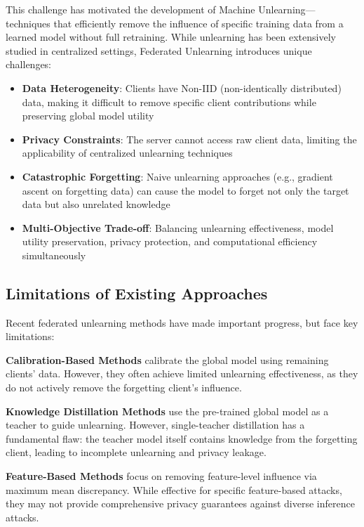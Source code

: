 \documentclass[11pt,a4paper]{article}
\begin{document}
This challenge has motivated the development of Machine Unlearning—techniques that efficiently remove the influence of specific training data from a learned model without full retraining. While unlearning has been extensively studied in centralized settings, Federated Unlearning introduces unique challenges:

\begin{itemize}
\item \textbf{Data Heterogeneity}: Clients have Non-IID (non-identically distributed) data, making it difficult to remove specific client contributions while preserving global model utility
\item \textbf{Privacy Constraints}: The server cannot access raw client data, limiting the applicability of centralized unlearning techniques
\item \textbf{Catastrophic Forgetting}: Naive unlearning approaches (e.g., gradient ascent on forgetting data) can cause the model to forget not only the target data but also unrelated knowledge
\item \textbf{Multi-Objective Trade-off}: Balancing unlearning effectiveness, model utility preservation, privacy protection, and computational efficiency simultaneously
\end{itemize}

\subsection{Limitations of Existing Approaches}

Recent federated unlearning methods have made important progress, but face key limitations:

\textbf{Calibration-Based Methods} calibrate the global model using remaining clients' data. However, they often achieve limited unlearning effectiveness, as they do not actively remove the forgetting client's influence.

\textbf{Knowledge Distillation Methods} use the pre-trained global model as a teacher to guide unlearning. However, single-teacher distillation has a fundamental flaw: the teacher model itself contains knowledge from the forgetting client, leading to incomplete unlearning and privacy leakage.

\textbf{Feature-Based Methods} focus on removing feature-level influence via maximum mean discrepancy. While effective for specific feature-based attacks, they may not provide comprehensive privacy guarantees against diverse inference attacks.
\end{document}
